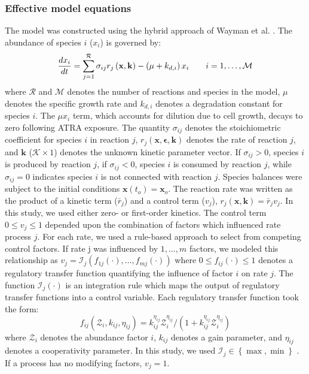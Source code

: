 \documentclass[10pt,twocolumn,twoside,final]{IEEEtran}
\begin{document}
\noindent\subsubsection*{Effective model equations}
The model was constructed using the hybrid approach of Wayman et al. \cite{pr3010138}.
The abundance of species $i$ ($x_{i}$) is governed by:
\begin{equation}
	\frac{dx_{i}}{dt}  =  \sum_{j = 1}^{\mathcal{R}}\sigma_{ij}r_{j}\left(\mathbf{x},\mathbf{k}\right) - \left(\mu+k_{d,i}\right)x_{i}\qquad{i=1,\hdots,\mathcal{M}}\\
\end{equation}
where $\mathcal{R}$ and $\mathcal{M}$ denotes the number of reactions and species in the model, $\mu$ denotes the specific growth rate and
$k_{d,i}$ denotes a degradation constant for species $i$. The $\mu x_{i}$ term, which accounts for dilution due to cell growth, decays to zero following ATRA exposure.
The quantity $\sigma_{ij}$ denotes the stoichiometric coefficient for species $i$ in reaction $j$,
$r_{j}\left(\mathbf{x},\mathbf{\epsilon},\mathbf{k}\right)$ denotes the rate of reaction $j$, and $\mathbf{k}$ ($\mathcal{K}\times{1}$) denotes the unknown kinetic parameter vector.
If $\sigma_{ij}>0$, species $i$ is produced by reaction $j$, if $\sigma_{ij}<0$, species $i$ is consumed by reaction $j$,
while $\sigma_{ij} = 0$ indicates species $i$ is not connected with reaction $j$.
Species balances were subject to the initial conditions $\mathbf{x}\left(t_{o}\right) = \mathbf{x}_{o}$.
The reaction rate was written as the product of a kinetic term ($\bar{r}_{j}$) and a control term ($v_{j}$), $r_{j}\left(\mathbf{x},\mathbf{k}\right) = \bar{r}_{j}v_{j}$.
In this study, we used either zero- or first-order kinetics.
The control term $0\leq v_{j}\leq 1$ depended upon the combination of factors which influenced rate process $j$.
For each rate, we used a rule-based approach to select from competing control factors.
If rate j was influenced by $1,\dots,m$ factors, we modeled this relationship as
$v_{j} = \mathcal{I}_{j}\left(f_{1j}\left(\cdot\right),\hdots,f_{mj}\left(\cdot\right)\right)$
where $0\leq f_{ij}\left(\cdot\right)\leq 1$ denotes a regulatory transfer function quantifying the influence of factor $i$ on rate $j$.
The function $\mathcal{I}_{j}\left(\cdot\right)$ is an integration rule which maps the output of regulatory transfer functions into a control
variable. Each regulatory transfer function took the form:
\begin{equation}\label{eqn:control-factor}
	f_{ij}\left(\mathcal{Z}_{i},k_{ij},\eta_{ij}\right) = k_{ij}^{\eta_{ij}}\mathcal{Z}_{i}^{\eta_{ij}}/\left({1 + k_{ij}^{\eta_{ij}}\mathcal{Z}_{i}^{\eta_{ij}}}\right)
\end{equation}where $\mathcal{Z}_{i}$ denotes the abundance factor $i$, $k_{ij}$ denotes a gain parameter, and $\eta_{ij}$ denotes a cooperativity parameter.
In this study, we used $\mathcal{I}_{j}\in\left\{\max,\min\right\}$ \cite{pr3010138}. If a process has no modifying factors, $v_{j} = 1$.
\end{document}
